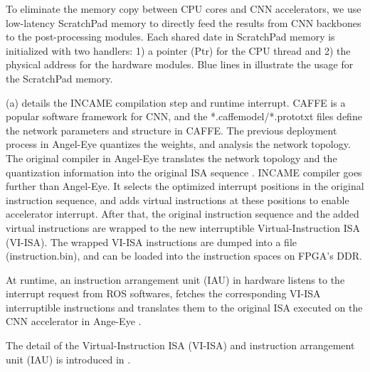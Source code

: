 To eliminate the memory copy between CPU cores and CNN accelerators, we use low-latency ScratchPad memory \cite{Banakar2002Scratchpad} to directly feed the results from CNN backbones to the post-processing modules. Each shared date in ScratchPad memory is initialized with two handlers: 1) a pointer (Ptr) for the CPU thread and 2) the physical address for the hardware modules. Blue lines in  illustrate the usage for the ScratchPad memory.

(a) details the INCAME compilation step and runtime interrupt. CAFFE \cite{jia2014caffe} is a popular software framework for CNN, and the *.caffemodel/*.prototxt files define the network parameters and structure in CAFFE. The previous deployment process in Angel-Eye \cite{guo2017angel} quantizes the weights, and analysis the network topology. The original compiler in Angel-Eye translates the network topology and the quantization information into the original ISA sequence \cite{guo2017angel}. INCAME compiler goes further than Angel-Eye. It selects the optimized interrupt positions in the original instruction sequence, and adds virtual instructions at these positions to enable accelerator interrupt. After that, the original instruction sequence and the added virtual instructions are wrapped to the new interruptible Virtual-Instruction ISA (VI-ISA). The wrapped VI-ISA instructions are dumped into a file (instruction.bin), and can be loaded into the instruction spaces on FPGA's DDR.

At runtime, an instruction arrangement unit (IAU) in hardware listens to the interrupt request from ROS softwares, fetches the corresponding VI-ISA interruptible instructions and translates them to the original ISA executed on the CNN accelerator in Ange-Eye \cite{guo2017angel}. 

The detail of the Virtual-Instruction ISA (VI-ISA) and instruction arrangement unit (IAU) is introduced in .